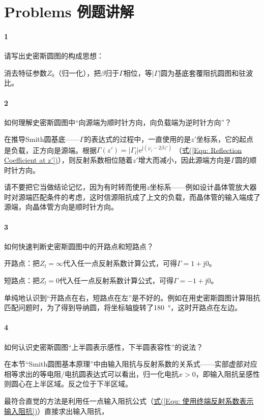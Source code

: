 \section{Problems 例题讲解}
\paragraph{1} 请写出史密斯圆图的构成思想：

消去特征参数$Z_0$（归一化），把$\beta$归于$\varGamma$相位，等$|\varGamma|$圆为基底套覆阻抗圆图和驻波比。

\paragraph{2} 如何理解史密斯圆图中“向源端为顺时针方向，向负载端为逆时针方向”？

在推导Smith圆基底——$\varGamma$的表达式的过程中，一直使用的是$z'$坐标系，它的起点是负载，正方向是源端。根据$\varGamma(z')=|\varGamma_l|\mathrm{e}^{\mathrm{j}(\varphi_l-2\beta z')}$ （\hyperref[Equ: Reflection Coefficient at z']{式(\ref*{Equ: Reflection Coefficient at z'})}），则反射系数相位随着$z'$增大而减小，因此源端方向是$\varGamma$圆的顺时针方向。

请不要把它当做结论记忆，因为有时转而使用$z$坐标系——例如设计晶体管放大器时对源端匹配条件的考虑，这时信源阻抗成了上文的负载，而晶体管的输入端成了源端，向晶体管方向是顺时针方向。

\paragraph{3} 如何快速判断史密斯圆图中的开路点和短路点？

开路点：把$Z_l=\infty$代入任一点反射系数计算公式，可得$\varGamma=1+\mathrm{j}0$。

短路点：把$Z_l=0$代入任一点反射系数计算公式，可得$\varGamma=-1+\mathrm{j}0$。

单纯地认识到“开路点在右，短路点在左”是不好的。例如在用史密斯圆图计算阻抗匹配问题时，为了得到导纳圆，将坐标轴旋转了\SI{180}{\degree}，这时开路点在左边。
\paragraph{4} 如何认识史密斯圆图“上半圆表示感性，下半圆表容性”的说法？

在本节“Smith圆图基本原理”中由输入阻抗与反射系数的关系式——实部虚部对应相等求出的等电阻/电抗圆表达式可以看出，归一化电抗$x>0$，即输入阻抗呈感性则圆心在上半区域。反之位于下半区域。



最符合直觉的方法是利用任一点输入阻抗公式（\hyperref[Equ: 使用终端反射系数表示输入阻抗]{式(\ref*{Equ: 使用终端反射系数表示输入阻抗})}）直接求出输入阻抗，

